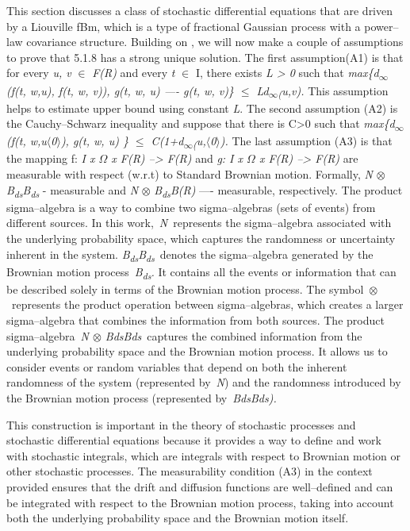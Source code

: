 \documentclass[12pt,a4paper]{report}
\numberwithin{equation}{section}
\begin{document}
This section discusses a class of stochastic differential equations that
are driven by a Liouville fBm, which is a type of fractional Gaussian
process with a power--law covariance structure. Building on \cite{jafari2021fuzzy_81}, we
will now make a couple of assumptions to prove that 5.1.8 has a strong
unique solution. The first assumption(A1) is that for every \emph{u, v}
\(\in\) \emph{F(R)} and every \emph{t} \(\in\) I, there exists \emph{L
\textgreater{} 0} such that \emph{max\{d\textsubscript{$\infty$}(f(t, w,u),
f(t, w, v)), \textbar g(t, w, u) ---- g(t, w, v)\textbar\} $\leq$
Ld\textsubscript{$\infty$(}u,v).} This assumption helps to estimate upper bound
using constant \emph{L}. The second assumption (A2) is the
Cauchy--Schwarz inequality and suppose that there is C\textgreater0 such
that \emph{max\{d\textsubscript{$\infty$}(f(t, w,u$\langle$0$\rangle$), \textbar g(t, w,
u)\textbar{} \} $\leq$ C(1+d\textsubscript{$\infty$(}u,$\langle$0$\rangle$).} The last assumption
(A3) is that the mapping f: \emph{I x $\Omega$ x F(R) --\textgreater{} F(R)} and
\emph{g: I x $\Omega$ x F(R) --\textgreater{} F(R)} are measurable with respect
(w.r.t) to Standard Brownian motion. Formally, \emph{N} \(\otimes\)
\emph{B\textsubscript{ds}\textbar B\textsubscript{ds}} - measurable and
\emph{N} \(\otimes\) \emph{B\textsubscript{ds}\textbar B(R)} ----
measurable, respectively. The product sigma--algebra is a way to combine
two sigma--algebras (sets of events) from different sources. In this
work,~\emph{N}~represents the sigma--algebra associated with the
underlying probability space, which captures the randomness or
uncertainty inherent in the system.
\emph{B\textsubscript{ds}\textbar B\textsubscript{ds}}~denotes the
sigma--algebra generated by the Brownian motion
process~\emph{B\textsubscript{ds}.} It contains all the events or
information that can be described solely in terms of the Brownian motion
process. The symbol~$\otimes$~represents the product operation between
sigma--algebras, which creates a larger sigma--algebra that combines the
information from both sources. The product sigma--algebra~\emph{N $\otimes$
Bds\textbar Bds}~captures the combined information from the underlying
probability space and the Brownian motion process. It allows us to
consider events or random variables that depend on both the inherent
randomness of the system (represented by~\emph{N}) and the randomness
introduced by the Brownian motion process (represented
by~\emph{Bds\textbar Bds).}

This construction is important in the theory of stochastic processes and
stochastic differential equations because it provides a way to define
and work with stochastic integrals, which are integrals with respect to
Brownian motion or other stochastic processes. The measurability
condition (A3) in the context provided ensures that the drift and
diffusion functions are well--defined and can be integrated with respect
to the Brownian motion process, taking into account both the underlying
probability space and the Brownian motion itself.
\end{document}
